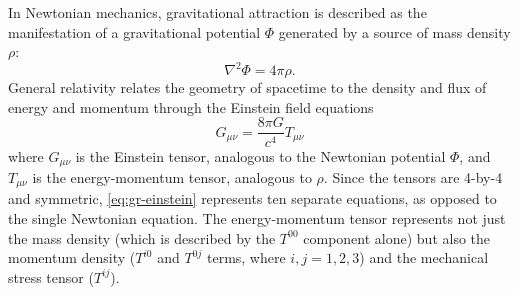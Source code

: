 In Newtonian mechanics, gravitational attraction is described as the manifestation of a gravitational potential $\Phi$ generated by a source of mass density $\rho$:
\begin{equation}
	\nabla^2 \Phi = 4\pi\rho.
\end{equation}
General relativity relates the geometry of spacetime to the density and flux of energy and momentum through the Einstein field equations
\begin{equation}\label{eq:gr-einstein}
	G_{\mu\nu} = \frac{8\pi G}{c^4} T_{\mu\nu}
\end{equation}
where $G_{\mu\nu}$ is the Einstein tensor, analogous to the Newtonian potential $\Phi$, and $T_{\mu\nu}$ is the energy-momentum tensor, analogous to $\rho$.
Since the tensors are 4-by-4 and symmetric, \cref{eq:gr-einstein} represents ten separate equations, as opposed to the single Newtonian equation.
The energy-momentum tensor represents not just the mass density (which is described by the $T^{00}$ component alone) but also the momentum density ($T^{i0}$ and $T^{0j}$ terms, where $i,j = 1, 2, 3$) and the mechanical stress tensor ($T^{ij}$).

